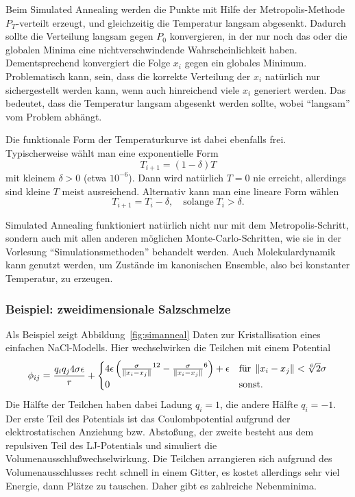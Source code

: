 Beim Simulated Annealing werden die Punkte mit Hilfe der
Metropolis-Methode $P_T$-verteilt erzeugt, und gleichzeitig die
Temperatur langsam abgesenkt. Dadurch sollte die Verteilung langsam
gegen $P_0$ konvergieren, in der nur noch das oder die globalen Minima
eine nichtverschwindende Wahrscheinlichkeit haben. Dementsprechend
konvergiert die Folge $x_i$ gegen ein globales Minimum. Problematisch
kann, sein, dass die korrekte Verteilung der $x_i$ natürlich nur
sichergestellt werden kann, wenn auch hinreichend viele $x_i$
generiert werden. Das bedeutet, dass die Temperatur langsam abgesenkt
werden sollte, wobei ``langsam'' vom Problem abhängt.

Die funktionale Form der Temperaturkurve ist dabei ebenfalls
frei. Typischerweise wählt man eine exponentielle Form
\begin{equation}
  T_{i+1} = (1-\delta)T
\end{equation}
mit kleinem $\delta > 0$ (etwa $10^{-6}$). Dann wird natürlich $T=0$
nie erreicht, allerdings sind kleine $T$ meist ausreichend. Alternativ
kann man eine lineare Form wählen
\begin{equation}
  T_{i+1} = T_i - \delta,\quad\text{solange}\; T_i>\delta.
\end{equation}

Simulated Annealing funktioniert natürlich nicht nur mit dem
Metropolis-Schritt, sondern auch mit allen anderen möglichen
Monte-Carlo-Schritten, wie sie in der Vorlesung
"`Simulationsmethoden"' behandelt werden. Auch Molekulardynamik kann
genutzt werden, um Zustände im kanonischen Ensemble, also bei
konstanter Temperatur, zu erzeugen.

\subsubsection{Beispiel: zweidimensionale Salzschmelze}
Als Beispiel zeigt Abbildung~\ref{fig:simanneal} Daten zur
Kristallisation eines einfachen NaCl-Modells. Hier wechselwirken die
Teilchen mit einem Potential
\begin{equation}
  \phi_{ij} = \frac{q_iq_j 4\sigma\epsilon}{r}  +
  \begin{cases}
    4\epsilon\left(\frac{\sigma}{\left\lVert{x_i-x_j}\right\rVert}^{12} -
      \frac{\sigma}{\left\lVert{x_i-x_j}\right\rVert}^{6}\right) + \epsilon
    & \text{für}\; \left\lVert{x_i-x_j}\right\rVert < \sqrt[6]{2}\sigma\\
    0 & \text{sonst}.
  \end{cases}
\end{equation}
Die Hälfte der Teilchen haben dabei Ladung $q_i=1$, die andere Hälfte
$q_i=-1$. Der erste Teil des Potentials ist das Coulombpotential
aufgrund der elektrostatischen Anziehung bzw. Abstoßung, der zweite
besteht aus dem repulsiven Teil des LJ-Potentials und simuliert die
Volumenausschlußwechselwirkung. Die Teilchen arrangieren sich aufgrund
des Volumenausschlusses recht schnell in einem Gitter, es kostet
allerdings sehr viel Energie, dann Plätze zu tauschen. Daher gibt es
zahlreiche Nebenminima.

